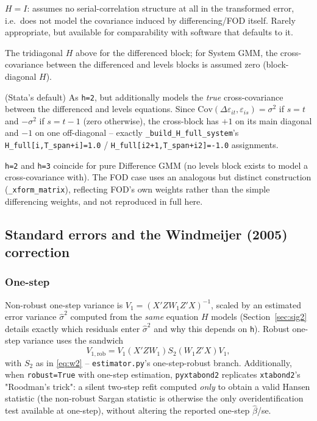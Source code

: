 \documentclass[11pt,a4paper]{article}
\newcommand{\pkg}{\texttt{pyxtabond2}}
\begin{document}
\begin{description}[nosep]
  \item[\texttt{h=1}] $H=I$: assumes no serial-correlation structure at all
    in the transformed error, i.e.\ does not model the covariance induced by
    differencing/FOD itself. Rarely appropriate, but available for
    comparability with software that defaults to it.
  \item[\texttt{h=2}] The tridiagonal $H$ above for the differenced block;
    for System GMM, the cross-covariance between the differenced and levels
    blocks is assumed zero (block-diagonal $H$).
  \item[\texttt{h=3}] (Stata's default) As \texttt{h=2}, but additionally
    models the \emph{true} cross-covariance between the differenced and
    levels equations. Since
    $\mathrm{Cov}(\Delta\varepsilon_{it},\varepsilon_{is})=\sigma^2$ if
    $s=t$ and $-\sigma^2$ if $s=t-1$ (zero otherwise), the cross-block has
    $+1$ on its main diagonal and $-1$ on one off-diagonal -- exactly
    \texttt{\_build\_H\_full\_system}'s
    \texttt{H\_full[i,T\_span+i]=1.0} / \texttt{H\_full[i2+1,T\_span+i2]=-1.0}
    assignments.
\end{description}
\texttt{h=2} and \texttt{h=3} coincide for pure Difference GMM (no levels
block exists to model a cross-covariance with). The FOD case uses an
analogous but distinct construction (\texttt{\_xform\_matrix}), reflecting
FOD's own weights rather than the simple differencing weights, and not
reproduced in full here.

\subsection{Standard errors and the Windmeijer (2005) correction}
\label{sec:windmeijer}

\subsubsection{One-step}

Non-robust one-step variance is $V_1=(X'ZW_1Z'X)^{-1}$, scaled by an
estimated error variance $\hat\sigma^2$ computed from the \emph{same}
equation $H$ models (Section~\ref{sec:sig2} details exactly which residuals
enter $\hat\sigma^2$ and why this depends on \texttt{h}). Robust one-step
variance uses the sandwich
\[
  V_{1,\mathrm{rob}} = V_1\left(X'ZW_1\right)S_2\left(W_1Z'X\right)V_1,
\]
with $S_2$ as in \eqref{eq:w2} -- \texttt{estimator.py}'s one-step-robust
branch. Additionally, when \texttt{robust=True} with one-step estimation,
\pkg{} replicates \texttt{xtabond2}'s "Roodman's trick": a silent two-step
refit computed \emph{only} to obtain a valid Hansen statistic (the
non-robust Sargan statistic is otherwise the only overidentification test
available at one-step), without altering the reported one-step
$\hat\beta$/se.
\end{document}
